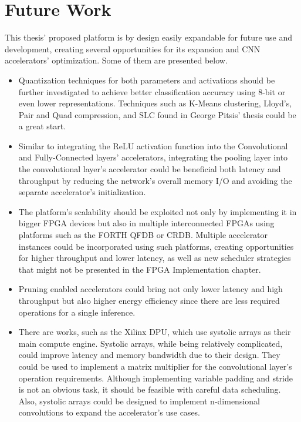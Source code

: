 \section{Future Work}
This thesis' proposed platform is by design easily expandable for future use and development, creating several opportunities for its expansion and CNN accelerators' optimization. Some of them are presented below.
\begin{itemize}
	\item Quantization techniques for both parameters and activations should be further investigated to achieve better classification accuracy using 8-bit or even lower representations. Techniques such as K-Means clustering, Lloyd's, Pair and Quad compression, and SLC found in George Pitsis' thesis \cite{Design-and-implementation-of-an-FPGA-based-convolutional-neural-network-accelerator} could be a great start.
	\item Similar to integrating the ReLU activation function into the Convolutional and Fully-Connected layers' accelerators, integrating the pooling layer into the convolutional layer's accelerator could be beneficial both latency and throughput by reducing the network's overall memory I/O and avoiding the separate accelerator's initialization.
	\item The platform's scalability should be exploited not only by implementing it in bigger FPGA devices but also in multiple interconnected FPGAs using platforms such as the FORTH QFDB or CRDB. Multiple accelerator instances could be incorporated using such platforms, creating opportunities for higher throughput and lower latency, as well as new scheduler strategies that might not be presented in the FPGA Implementation chapter.
	\item Pruning enabled accelerators could bring not only lower latency and high throughput but also higher energy efficiency since there are less required operations for a single inference.
	\item There are works, such as the Xilinx DPU, which use systolic arrays as their main compute engine. Systolic arrays, while being relatively complicated, could improve latency and memory bandwidth due to their design. They could be used to implement a matrix multiplier for the convolutional layer's operation requirements. Although implementing variable padding and stride is not an obvious task, it should be feasible with careful data scheduling. Also, systolic arrays could be designed to implement n-dimensional convolutions to expand the accelerator's use cases.

\end{itemize}
